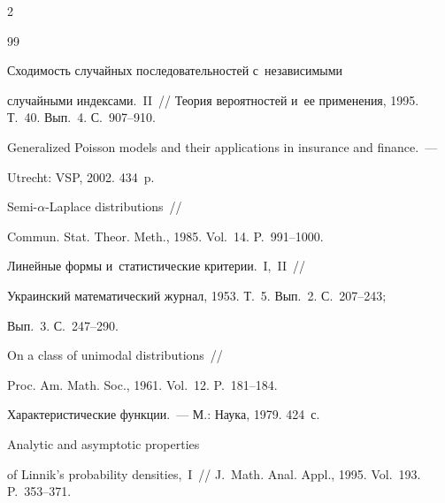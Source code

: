 \begin{multicols}{2}
{{\begin{thebibliography}{99}


 Сходимость случайных последовательностей с~независимыми 


случайными индексами.~II~// Теория вероятностей и~ее применения, 1995. Т.~40. Вып.~4. С.~907--910.









Generalized Poisson models and their applications in insurance and finance.~--- 


Utrecht: VSP, 2002. 434~p.







  Semi-$\alpha$-Laplace distributions~//


Commun. Stat. Theor. Meth., 1985. Vol.~14. P.~991--1000.







 Линейные формы и~статистические критерии.~I,~II~// 


Украинский математический журнал, 1953. Т.~5. Вып.~2. С.~207--243; 


Вып.~3. С.~247--290.







 On a class of unimodal distributions~// 


Proc. Am. Math. Soc., 1961. Vol.~12. P.~181--184.







 Характеристические функции.~--- М.: Наука, 1979. 424~с.







 Analytic and asymptotic properties 


of Linnik's probability densities,~I~// J.~Math. Anal. Appl., 1995. Vol.~193. P.~353--371.






\end{thebibliography}}}
\end{multicols}
